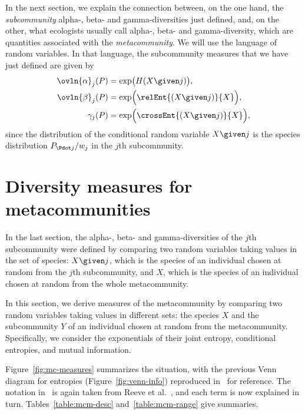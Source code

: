 In the next section, we explain the connection between, on the one hand,
the \emph{subcommunity} alpha-, beta- and gamma-diversities just defined,
and, on the other, what ecologists usually call alpha-, beta- and
gamma-diversity, which are quantities associated with the
\emph{metacommunity}.  We will use the language of random variables.  In
that language, the subcommunity measures that we have just defined are
given by
% 
\begin{align*}
\ovln{\alpha}_j(P)      &
=
\exp\bigl( H(X \given j) \bigr),        \\
\ovln{\beta}_j(P)  &
=
\exp\Bigl( \relEnt{(X \given j)}{X} \Bigr),     \\
\gamma_j(P)        &
=
\exp\Bigl( \crossEnt{(X \given j)}{X} \Bigr),
\end{align*}
% 
since the distribution of the conditional random variable $X \given j$ is
the species distribution $P_{\Pdot j}/w_j$ in the $j$th subcommunity.


\section{Diversity measures for metacommunities}


In the last section, the alpha-, beta- and gamma-diversities of the $j$th
subcommunity were defined by comparing two random variables taking values
in the set of species: $X \given j$, which is the species of an individual
chosen at random from the $j$th subcommunity, and $X$, which is the species
of an individual chosen at random from the whole metacommunity.

In this section, we derive measures of the metacommunity by comparing two
random variables taking values in different sets: the species $X$ and the
subcommunity $Y$ of an individual chosen at random from the metacommunity.
Specifically, we consider the exponentials of their joint entropy,
conditional entropies, and mutual information.

Figure~\ref{fig:mc-measures} summarizes the situation, with
the previous Venn diagram for entropies (Figure~\ref{fig:venn-info})
reproduced in~ for reference.  The notation in~
is again taken from Reeve et al.~\cite{HPD}, and each term is now explained in
turn.  Tables~\ref{table:mcm-desc} and~\ref{table:mcm-range} give 
summaries.

